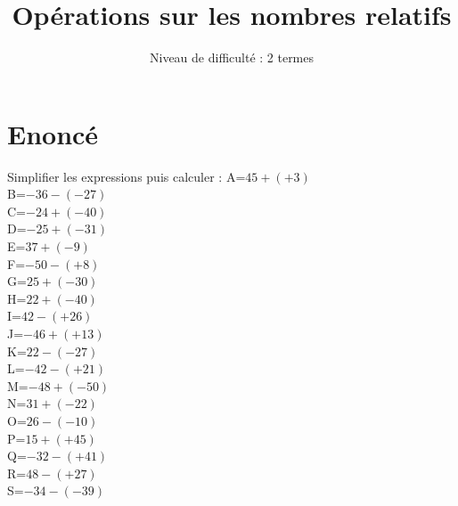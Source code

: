 \documentclass{article}%
\title{Opérations sur les nombres relatifs}%
\author{Niveau de difficulté : 2 termes}%
\date{{}}%
\begin{document}
%
\normalsize%
\pagestyle{empty}%
\maketitle%
\section{Enoncé}%
\label{sec:Enonc}%
Simplifier les expressions puis calculer :%
\newline%
%
\newline%
%
A=$45+(+3)$\\%
\vspace{0.35cm}%
B=$-36-(-27)$\\%
\vspace{0.35cm}%
C=$-24+(-40)$\\%
\vspace{0.35cm}%
D=$-25+(-31)$\\%
\vspace{0.35cm}%
E=$37+(-9)$\\%
\vspace{0.35cm}%
F=$-50-(+8)$\\%
\vspace{0.35cm}%
G=$25+(-30)$\\%
\vspace{0.35cm}%
H=$22+(-40)$\\%
\vspace{0.35cm}%
I=$42-(+26)$\\%
\vspace{0.35cm}%
J=$-46+(+13)$\\%
\vspace{0.35cm}%
K=$22-(-27)$\\%
\vspace{0.35cm}%
L=$-42-(+21)$\\%
\vspace{0.35cm}%
M=$-48+(-50)$\\%
\vspace{0.35cm}%
N=$31+(-22)$\\%
\vspace{0.35cm}%
O=$26-(-10)$\\%
\vspace{0.35cm}%
P=$15+(+45)$\\%
\vspace{0.35cm}%
Q=$-32-(+41)$\\%
\vspace{0.35cm}%
R=$48-(+27)$\\%
\vspace{0.35cm}%
S=$-34-(-39)$\\%
\end{document}
